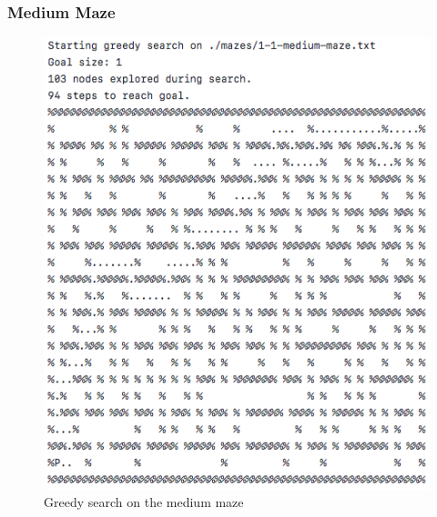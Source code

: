 \documentclass[titlepage]{article}
\begin{document}
\subsubsection{Medium Maze}
\begin{figure}[h!]
\includegraphics[width=\linewidth]{greedymedium.png}
\caption{Greedy search on the medium maze}
\label{fig:GREEDYmedium}
\end{figure}

\newpage
\end{document}
